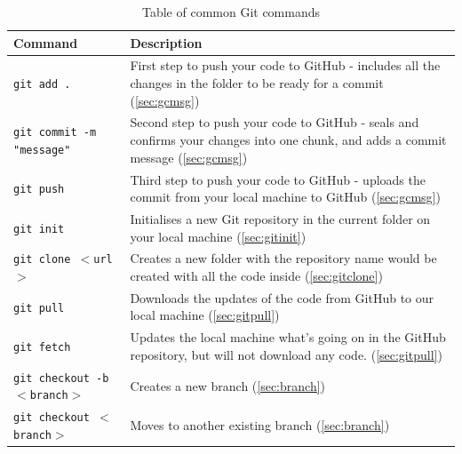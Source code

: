 \begin{table}[H]
    \centering
    \caption{Table of common Git commands}
    \vspace{6mm}
    \begin{tabular}{|m{7em}|m{23em}|}
        \hline
        \textbf{Command} & 
        Description 
        \\ \hline \hline
        
        \texttt{git add .} &
        First step to push your code to GitHub - includes all the changes in the folder to be ready for a commit (\cref{sec:gcmsg})
        \\ \hline
        
        \texttt{git commit -m "message"} &
        Second step to push your code to GitHub - seals and confirms your changes into one chunk, and adds a commit message (\cref{sec:gcmsg})
        \\ \hline
        
        \texttt{git push} &
        Third step to push your code to GitHub - uploads the commit from your local machine to GitHub (\cref{sec:gcmsg})
        \\ \hline
        
        \texttt{git init} &
        Initialises a new Git repository in the current folder on your local machine (\cref{sec:gitinit})
        \\ \hline
        
        \texttt{git clone $<$url$>$} &
        Creates a new folder with the repository name would be created with all the code inside (\cref{sec:gitclone})
        \\ \hline
        
        \texttt{git pull} &
        Downloads the updates of the code from GitHub to our local machine (\cref{sec:gitpull})
        \\ \hline
        
        \texttt{git fetch} &
        Updates the local machine what's going on in the GitHub repository, but will not download any code. (\cref{sec:gitpull})
        \\ \hline
        
        \texttt{git checkout -b $<$branch$>$} &
        Creates a new branch (\cref{sec:branch})
        \\ \hline
        
        \texttt{git checkout $<$branch$>$} &
        Moves to another existing branch (\cref{sec:branch})
        \\ \hline
        

\end{tabular}
\end{table}

